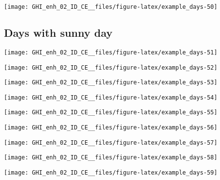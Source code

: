 \documentclass[
  10pt,
  a4paper,oneside]{article}
\begin{document}
\begin{center}\texttt{[image: GHI\_enh\_02\_ID\_CE\_\_files/figure-latex/example\_days-50]} \end{center}

\FloatBarrier

\hypertarget{days-with-sunny-day}{%
\subsection{Days with sunny day}\label{days-with-sunny-day}}

\begin{center}\texttt{[image: GHI\_enh\_02\_ID\_CE\_\_files/figure-latex/example\_days-51]} \end{center}

\begin{center}\texttt{[image: GHI\_enh\_02\_ID\_CE\_\_files/figure-latex/example\_days-52]} \end{center}

\begin{center}\texttt{[image: GHI\_enh\_02\_ID\_CE\_\_files/figure-latex/example\_days-53]} \end{center}

\begin{center}\texttt{[image: GHI\_enh\_02\_ID\_CE\_\_files/figure-latex/example\_days-54]} \end{center}

\begin{center}\texttt{[image: GHI\_enh\_02\_ID\_CE\_\_files/figure-latex/example\_days-55]} \end{center}

\begin{center}\texttt{[image: GHI\_enh\_02\_ID\_CE\_\_files/figure-latex/example\_days-56]} \end{center}

\begin{center}\texttt{[image: GHI\_enh\_02\_ID\_CE\_\_files/figure-latex/example\_days-57]} \end{center}

\begin{center}\texttt{[image: GHI\_enh\_02\_ID\_CE\_\_files/figure-latex/example\_days-58]} \end{center}

\begin{center}\texttt{[image: GHI\_enh\_02\_ID\_CE\_\_files/figure-latex/example\_days-59]} \end{center}
\end{document}
